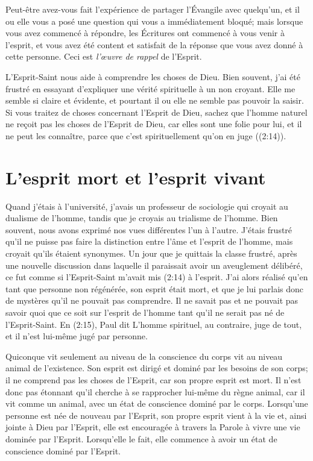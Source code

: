 Peut-être avez-vous fait l'expérience de partager l'Évangile avec quelqu'un,
 et il ou elle vous a posé une question qui vous a immédiatement bloqué;
 mais lorsque vous avez commencé à répondre, les Écritures ont commencé
 à vous venir à l'esprit, et vous avez été content et satisfait de la réponse
 que vous avez donné à cette personne. Ceci est \emph{l'œuvre de rappel}
 de l'Esprit.

L'Esprit-Saint nous aide à comprendre les choses de Dieu.
 Bien souvent, j'ai été frustré en essayant d'expliquer
 une vérité spirituelle à un non croyant.
 Elle me semble si claire et évidente, et pourtant il ou elle ne semble pas
 pouvoir la saisir.
 Si vous traitez de choses concernant l'Esprit de Dieu,
 sachez que l'homme naturel \Og ne reçoit pas les choses de l'Esprit de Dieu,
 car elles sont une folie pour lui, et il ne peut les connaître,
 parce que c'est spirituellement qu'on en juge \Fg{}
 ((2:14)).


\section{L'esprit mort et l'esprit vivant}

Quand j'étais à l'université, j'avais un professeur de sociologie
 qui croyait au dualisme de l'homme, tandis que je croyais au trialisme de l'homme.
 Bien souvent, nous avons exprimé nos vues différentes l'un à l'autre.
 J'étais frustré qu'il ne puisse pas faire la distinction entre l'âme
 et l'esprit de l'homme, mais croyait qu'ils étaient synonymes.
 Un jour que je quittais la classe frustré,
 après une nouvelle discussion dans laquelle il paraissait
 avoir un aveuglement délibéré, ce fut comme si l'Esprit-Saint
 m'avait mis (2:14) à l'esprit.
 J'ai alors réalisé qu'en tant que
 personne non régénérée, son esprit était mort,
 et que je lui parlais donc de mystères qu'il ne
 pouvait pas comprendre.
 Il ne savait pas et ne
 pouvait pas savoir quoi que ce soit sur l'esprit
 de l'homme tant qu'il ne serait pas né de l'Esprit-Saint.
 En (2:15), Paul dit\frcolon{}
 \Og L'homme spirituel, au contraire, juge de tout,
 et il n'est lui-même jugé par personne. \Fg{}

Quiconque vit seulement au niveau de la conscience du corps
 vit au niveau animal de l'existence.
 Son esprit est dirigé et dominé par les besoins de son corps;
 il ne comprend pas les choses de l'Esprit, car son propre esprit est mort.
 Il n'est donc pas étonnant qu'il cherche à se rapprocher lui-même
 du règne animal, car il vit comme un animal,
 avec un état de conscience dominé par le corps.
 Lorsqu'une personne est née de nouveau par l'Esprit,
 son propre esprit vient à la vie et, ainsi jointe à Dieu par l'Esprit,
 elle est encouragée à travers la Parole à vivre une vie dominée par l'Esprit.
 Lorsqu'elle le fait, elle commence à avoir un état de conscience dominé par l'Esprit.


